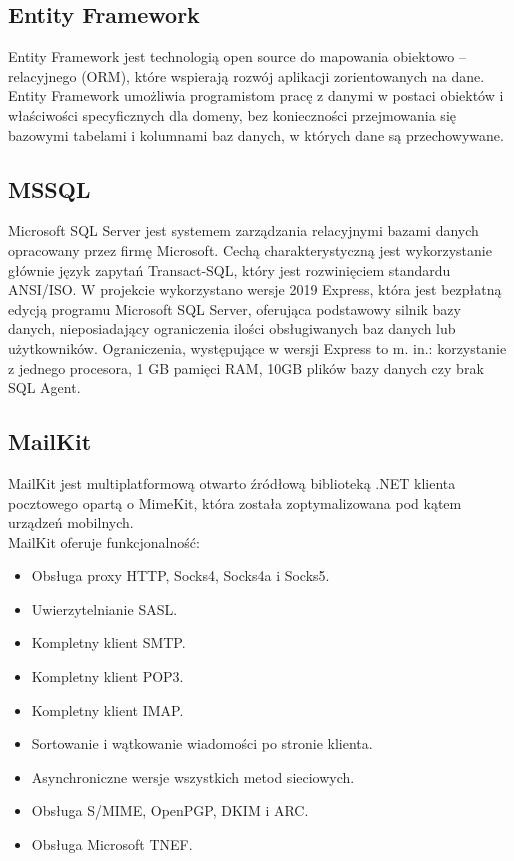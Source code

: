 \documentclass[12pt,a4paper]{article}
\begin{document}
		\subsection{Entity Framework}		 
		 Entity Framework jest technologią open source do mapowania obiektowo – relacyjnego (ORM), które wspierają rozwój aplikacji zorientowanych na dane.
		 Entity Framework umożliwia programistom pracę z danymi w postaci obiektów i właściwości specyficznych dla domeny, bez konieczności przejmowania się bazowymi
		 tabelami i kolumnami baz danych, w których dane są przechowywane. 

		\subsection{MSSQL}		 
		 	Microsoft SQL Server jest systemem zarządzania relacyjnymi bazami danych opracowany przez firmę Microsoft. Cechą charakterystyczną jest wykorzystanie głównie język zapytań
		 	Transact-SQL, który jest rozwinięciem standardu ANSI/ISO. W projekcie wykorzystano wersje 2019 Express, która jest bezpłatną edycją programu Microsoft SQL Server, oferująca
		 	podstawowy silnik bazy danych, nieposiadający ograniczenia ilości obsługiwanych baz danych lub użytkowników. Ograniczenia, występujące w wersji Express to  m. in.:
		 	korzystanie z jednego procesora, 1 GB pamięci RAM, 10GB plików bazy danych czy brak SQL Agent.
		
		\subsection{MailKit}
			MailKit jest multiplatformową otwarto źródłową biblioteką .NET klienta pocztowego opartą o MimeKit, która została zoptymalizowana pod kątem urządzeń mobilnych.\\
			MailKit oferuje funkcjonalność:
			\begin{itemize}
				\item Obsługa proxy HTTP, Socks4, Socks4a i Socks5.
				\item Uwierzytelnianie SASL.
				\item Kompletny klient SMTP.
				\item Kompletny klient POP3.
				\item Kompletny klient IMAP.
				\item Sortowanie i wątkowanie wiadomości po stronie klienta.
				\item Asynchroniczne wersje wszystkich metod sieciowych.
				\item Obsługa S/MIME, OpenPGP, DKIM i ARC.
				\item Obsługa Microsoft TNEF.
			\end{itemize}
\end{document}
